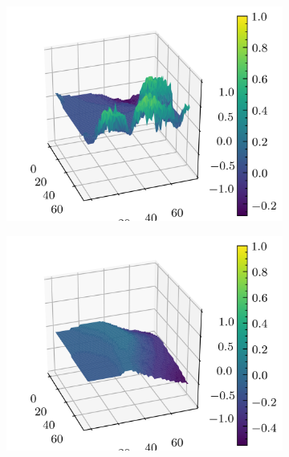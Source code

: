 \documentclass[../document.tex]{subfiles}
\begin{document}
\begin{figure}[H]
    \begin{subfigure}[b]{0.19\textwidth}
        \includegraphics[width=\linewidth]{../img/5/quarry/false_negative/patch-3d-0.png}
    \end{subfigure}
    \begin{subfigure}[b]{0.19\textwidth}
        \includegraphics[width=\linewidth]{../img/5/quarry/false_negative/patch-3d-1.png}
    \end{subfigure}  
    \begin{subfigure}[b]{0.19\textwidth}

\end{subfigure}
\end{figure}
\end{document}
